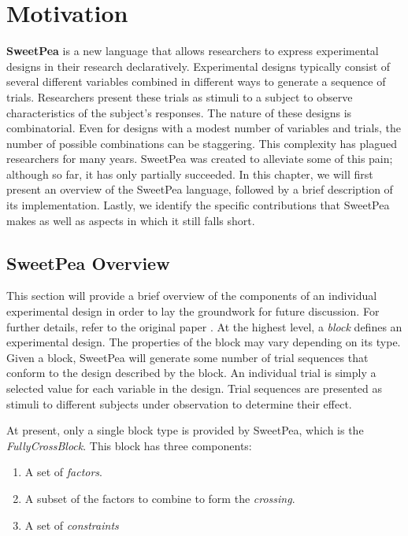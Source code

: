 \chapter{Motivation}

\textbf{SweetPea} \cite{annie} is a new language that allows researchers to express experimental designs in their research declaratively. Experimental designs typically consist of several different variables combined in different ways to generate a sequence of trials. Researchers present these trials as stimuli to a subject to observe characteristics of the subject's responses. The nature of these designs is combinatorial. Even for designs with a modest number of variables and trials, the number of possible combinations can be staggering. This complexity has plagued researchers for many years. SweetPea was created to alleviate some of this pain; although so far, it has only partially succeeded. In this chapter, we will first present an overview of the SweetPea language, followed by a brief description of its implementation. Lastly, we identify the specific contributions that SweetPea makes as well as aspects in which it still falls short.


\section{SweetPea Overview}

This section will provide a brief overview of the components of an individual experimental design in order to lay the groundwork for future discussion. For further details, refer to the original paper \cite{annie}. At the highest level, a \textit{block} defines an experimental design.  The properties of the block may vary depending on its type. Given a block, SweetPea will generate some number of trial sequences that conform to the design described by the block. An individual trial is simply a selected value for each variable in the design. Trial sequences are presented as stimuli to different subjects under observation to determine their effect.

At present, only a single block type is provided by SweetPea, which is the \textit{FullyCrossBlock}. This block has three components:

\begin{enumerate}
\item A set of \textit{factors}.
\item A subset of the factors to combine to form the \textit{crossing}.
\item A set of \textit{constraints}
\end{enumerate}


